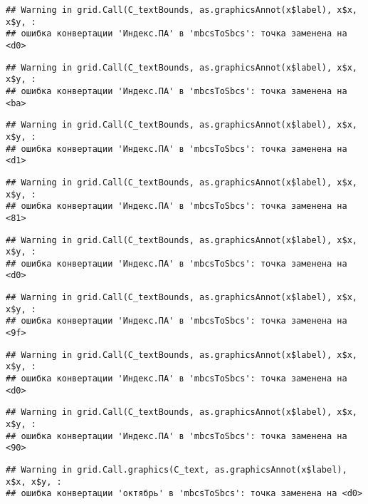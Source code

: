 \documentclass[
]{article}
\begin{document}
\begin{verbatim}
## Warning in grid.Call(C_textBounds, as.graphicsAnnot(x$label), x$x, x$y, :
## ошибка конвертации 'Индекс.ПА' в 'mbcsToSbcs': точка заменена на <d0>
\end{verbatim}

\begin{verbatim}
## Warning in grid.Call(C_textBounds, as.graphicsAnnot(x$label), x$x, x$y, :
## ошибка конвертации 'Индекс.ПА' в 'mbcsToSbcs': точка заменена на <ba>
\end{verbatim}

\begin{verbatim}
## Warning in grid.Call(C_textBounds, as.graphicsAnnot(x$label), x$x, x$y, :
## ошибка конвертации 'Индекс.ПА' в 'mbcsToSbcs': точка заменена на <d1>
\end{verbatim}

\begin{verbatim}
## Warning in grid.Call(C_textBounds, as.graphicsAnnot(x$label), x$x, x$y, :
## ошибка конвертации 'Индекс.ПА' в 'mbcsToSbcs': точка заменена на <81>
\end{verbatim}

\begin{verbatim}
## Warning in grid.Call(C_textBounds, as.graphicsAnnot(x$label), x$x, x$y, :
## ошибка конвертации 'Индекс.ПА' в 'mbcsToSbcs': точка заменена на <d0>
\end{verbatim}

\begin{verbatim}
## Warning in grid.Call(C_textBounds, as.graphicsAnnot(x$label), x$x, x$y, :
## ошибка конвертации 'Индекс.ПА' в 'mbcsToSbcs': точка заменена на <9f>
\end{verbatim}

\begin{verbatim}
## Warning in grid.Call(C_textBounds, as.graphicsAnnot(x$label), x$x, x$y, :
## ошибка конвертации 'Индекс.ПА' в 'mbcsToSbcs': точка заменена на <d0>
\end{verbatim}

\begin{verbatim}
## Warning in grid.Call(C_textBounds, as.graphicsAnnot(x$label), x$x, x$y, :
## ошибка конвертации 'Индекс.ПА' в 'mbcsToSbcs': точка заменена на <90>
\end{verbatim}

\begin{verbatim}
## Warning in grid.Call.graphics(C_text, as.graphicsAnnot(x$label), x$x, x$y, :
## ошибка конвертации 'октябрь' в 'mbcsToSbcs': точка заменена на <d0>
\end{verbatim}
\end{document}
